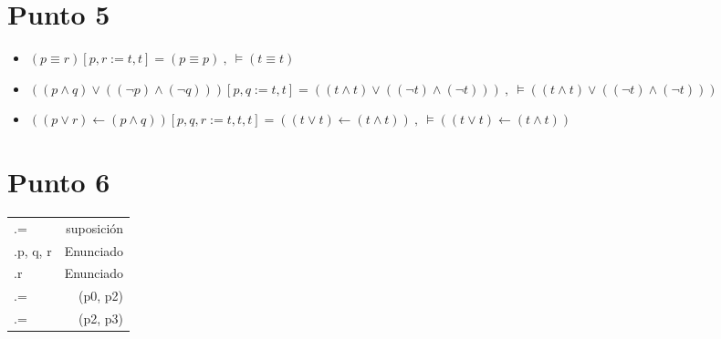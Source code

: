 \documentclass{article}
\newlength{\logicv}
\newenvironment{logicenv}[2][0]{
  \begin{tcolorbox}[demo, title = #2]
  \vspace*{#1\logicv}
}{
  \end{tcolorbox}
}
\newenvironment{logic}{
    \setlength{\extrarowheight}{3pt}
    \setcounter{row}{-1}
    \begin{center}
    \begin{NiceTabular}{>{\stepcounter{row}\therow.\hspace*{5pt}} L r }
}{
    \end{NiceTabular}
    \end{center}
}
\begin{document}
\section{Punto 5}
\begin{logicenv}[5]{punto 5}
    \begin{itemize}
        \item $(p \equiv r)[p, r := t, t] = (p \equiv p)\ ,\ \vDash (t \equiv t)$
        \item $((p \land q) \lor ((\neg p) \land (\neg q)))[p, q := t, t] = ((t \land t) \lor ((\neg t) \land (\neg t)))\ ,\ \vDash ((t \land t) \lor ((\neg t) \land (\neg t)))$
        \item $((p \lor r) \gets (p \land q))[p, q, r := t, t, t] = ((t \lor t) \gets (t \land t))\ ,\ \vDash ((t \lor t) \gets (t \land t))$
    \end{itemize}
\end{logicenv}

\section{Punto 6}
\begin{logicenv}{punto 6}
    \begin{logic}
        \gamma = \psi[q := r] & suposición\\
        p, q, r  & Enunciado\\
        r  \phi {} \psi & Enunciado\\
        \phi[p := \gamma] = \phi[p := \psi][q := r] & (p0, p2)\\
        \phi[p := \psi][q := r][q := \tau][r := q] = \phi[p, q := \psi, \tau] & (p2, p3)
    \end{logic}
\end{logicenv}
\end{document}
